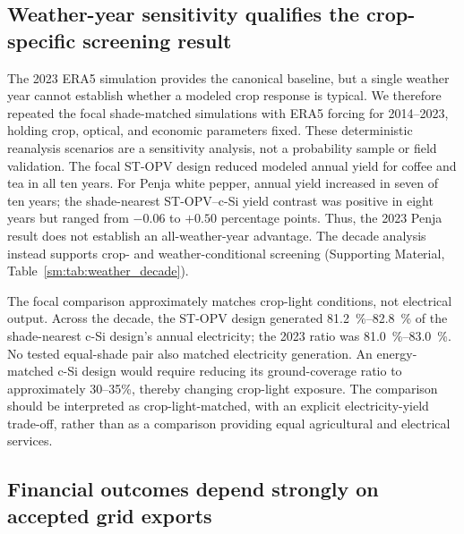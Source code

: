 
\subsection{Weather-year sensitivity qualifies the crop-specific screening result}
\label{sec:weather_year_sensitivity}

The 2023 ERA5 simulation provides the canonical baseline, but a single weather year cannot establish whether a modeled crop response is typical. We therefore repeated the focal shade-matched simulations with ERA5 forcing for 2014--2023, holding crop, optical, and economic parameters fixed. These deterministic reanalysis scenarios are a sensitivity analysis, not a probability sample or field validation. The focal ST-OPV design reduced modeled annual yield for coffee and tea in all ten years. For Penja white pepper, annual yield increased in seven of ten years; the shade-nearest ST-OPV--c-Si yield contrast was positive in eight years but ranged from $-0.06$ to $+0.50$ percentage points. Thus, the 2023 Penja result does not establish an all-weather-year advantage. The decade analysis instead supports crop- and weather-conditional screening (Supporting Material, Table~\cref{sm:tab:weather_decade}).

The focal comparison approximately matches crop-light conditions, not electrical output. Across the decade, the ST-OPV design generated \qtyrange{81.2}{82.8}{\percent} of the shade-nearest c-Si design's annual electricity; the 2023 ratio was \qtyrange{81.0}{83.0}{\percent}. No tested equal-shade pair also matched electricity generation. An energy-matched c-Si design would require reducing its ground-coverage ratio to approximately 30--35\%, thereby changing crop-light exposure. The comparison should be interpreted as crop-light-matched, with an explicit electricity-yield trade-off, rather than as a comparison providing equal agricultural and electrical services.

\subsection{Financial outcomes depend strongly on accepted grid exports}
\label{sec:export_acceptance}


